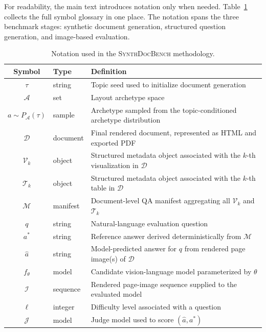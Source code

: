 \documentclass{article} %
\begin{document}
For readability, the main text introduces notation only when needed. Table~\ref{tab:notation_appendix}
collects the full symbol glossary in one place. The notation spans the three benchmark
stages: synthetic document generation, structured question generation, and image-based
evaluation.

\begin{table}[htbp]
\centering
\small
\caption{Notation used in the \textsc{SynthDocBench} methodology.}
\label{tab:notation_appendix}
\begin{tabular}{clp{10cm}}
\toprule
\textbf{Symbol} & \textbf{Type} & \textbf{Definition} \\
\midrule
$\tau$        & string     & Topic seed used to initialize document generation \\
$\mathcal{A}$ & set        & Layout archetype space \\
$a \sim P_{\mathcal{A}}(\tau)$ & sample & Archetype sampled from the topic-conditioned archetype distribution \\
$\mathcal{D}$ & document   & Final rendered document, represented as HTML and exported PDF \\
$\mathcal{V}_k$ & object   & Structured metadata object associated with the $k$-th visualization in $\mathcal{D}$ \\
$\mathcal{T}_k$ & object   & Structured metadata object associated with the $k$-th table in $\mathcal{D}$ \\
$\mathcal{M}$ & manifest   & Document-level QA manifest aggregating all $\mathcal{V}_k$ and $\mathcal{T}_k$ \\
$q$           & string     & Natural-language evaluation question \\
$a^*$         & string     & Reference answer derived deterministically from $\mathcal{M}$ \\
$\hat{a}$     & string     & Model-predicted answer for $q$ from rendered page image(s) of $\mathcal{D}$ \\
$f_\theta$    & model      & Candidate vision-language model parameterized by $\theta$ \\
$\mathcal{I}$ & sequence   & Rendered page-image sequence supplied to the evaluated model \\
$\ell$        & integer    & Difficulty level associated with a question \\
$\mathcal{J}$ & model      & Judge model used to score $(\hat{a}, a^*)$ \\
\bottomrule
\end{tabular}
\end{table}
\end{document}
